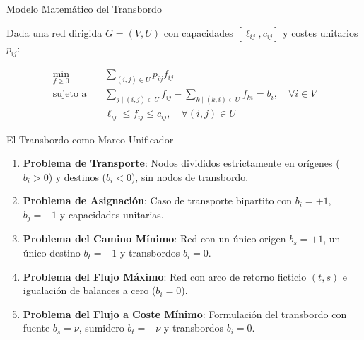 \documentclass[
  ignorenonframetext,
]{beamer}
\providecommand{\tightlist}{%
  \setlength{\itemsep}{0pt}\setlength{\parskip}{0pt}}
\begin{document}
\begin{frame}{Modelo Matemático del Transbordo}
\label{modelo-matemuxe1tico-del-transbordo}
\begin{tcolorbox}[enhanced jigsaw, opacityback=0, breakable, title=\textcolor{quarto-callout-note-color}{\faInfo}\hspace{0.5em}{Modelo lineal del problema del transbordo}, colback=white, colbacktitle=quarto-callout-note-color!10!white, bottomrule=.15mm, opacitybacktitle=0.6, coltitle=black, bottomtitle=1mm, leftrule=.75mm, colframe=quarto-callout-note-color-frame, toptitle=1mm, titlerule=0mm, rightrule=.15mm, left=2mm, arc=.35mm, toprule=.15mm]

Dada una red dirigida \(G = (V, U)\) con capacidades
\([\ell_{ij}, c_{ij}]\) y costes unitarios \(p_{ij}\):

\[
\begin{aligned}
\min_{f \ge 0} \quad & \sum_{(i,j) \in U} p_{ij} f_{ij} \\
\text{sujeto a} \quad & \sum_{j \mid (i, j) \in U} f_{ij} - \sum_{k \mid (k, i) \in U} f_{ki} = b_i, \quad \forall i \in V \\
& \ell_{ij} \le f_{ij} \le c_{ij}, \quad \forall (i, j) \in U
\end{aligned}
\]

\end{tcolorbox}
\end{frame}

\begin{frame}{El Transbordo como Marco Unificador}
\label{el-transbordo-como-marco-unificador}
\begin{enumerate}
\tightlist
\item
  \textbf{Problema de Transporte}: Nodos divididos estrictamente en
  orígenes (\(b_i > 0\)) y destinos (\(b_i < 0\)), sin nodos de
  transbordo.
\item
  \textbf{Problema de Asignación}: Caso de transporte bipartito con
  \(b_i = +1\), \(b_j = -1\) y capacidades unitarias.
\item
  \textbf{Problema del Camino Mínimo}: Red con un único origen
  \(b_s = +1\), un único destino \(b_t = -1\) y transbordos \(b_i = 0\).
\item
  \textbf{Problema del Flujo Máximo}: Red con arco de retorno ficticio
  \((t, s)\) e igualación de balances a cero (\(b_i = 0\)).
\item
  \textbf{Problema del Flujo a Coste Mínimo}: Formulación del transbordo
  con fuente \(b_s = \nu\), sumidero \(b_t = -\nu\) y transbordos
  \(b_i = 0\).
\end{enumerate}
\end{frame}
\end{document}
